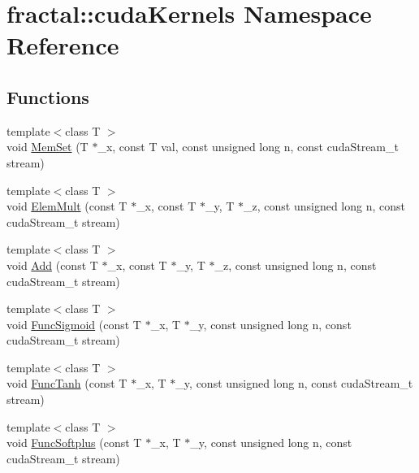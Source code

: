 \hypertarget{namespacefractal_1_1cudaKernels}{\section{fractal\+:\+:cuda\+Kernels Namespace Reference}
\label{namespacefractal_1_1cudaKernels}
}
\subsection*{Functions}
\begin{DoxyCompactItemize}
\item 
{\footnotesize template$<$class T $>$ }\\void \hyperlink{namespacefractal_1_1cudaKernels_a2f4f2776037a4f202000996e3da29b29}{Mem\+Set} (T $\ast$\+\_\+x, const T val, const unsigned long n, const cuda\+Stream\+\_\+t stream)
\item 
{\footnotesize template$<$class T $>$ }\\void \hyperlink{namespacefractal_1_1cudaKernels_af411d22b137514fd35f5da081eca1299}{Elem\+Mult} (const T $\ast$\+\_\+x, const T $\ast$\+\_\+y, T $\ast$\+\_\+z, const unsigned long n, const cuda\+Stream\+\_\+t stream)
\item 
{\footnotesize template$<$class T $>$ }\\void \hyperlink{namespacefractal_1_1cudaKernels_ad08024d3280d81d84bd682a608f1c70d}{Add} (const T $\ast$\+\_\+x, const T $\ast$\+\_\+y, T $\ast$\+\_\+z, const unsigned long n, const cuda\+Stream\+\_\+t stream)
\item 
{\footnotesize template$<$class T $>$ }\\void \hyperlink{namespacefractal_1_1cudaKernels_a0253e39cf1f3905c6aaa5f8fc875206a}{Func\+Sigmoid} (const T $\ast$\+\_\+x, T $\ast$\+\_\+y, const unsigned long n, const cuda\+Stream\+\_\+t stream)
\item 
{\footnotesize template$<$class T $>$ }\\void \hyperlink{namespacefractal_1_1cudaKernels_aab7275ddaf88bbdc0a340e1f6d1010a5}{Func\+Tanh} (const T $\ast$\+\_\+x, T $\ast$\+\_\+y, const unsigned long n, const cuda\+Stream\+\_\+t stream)
\item 
{\footnotesize template$<$class T $>$ }\\void \hyperlink{namespacefractal_1_1cudaKernels_a302c1507d587dd97bb1b0c0b4e5e6378}{Func\+Softplus} (const T $\ast$\+\_\+x, T $\ast$\+\_\+y, const unsigned long n, const cuda\+Stream\+\_\+t stream)
\item 

\end{DoxyCompactItemize}
